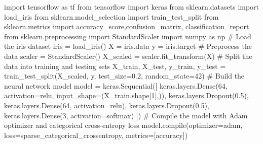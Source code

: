 \documentclass[
  letterpaper,
  DIV=11,
  numbers=noendperiod]{scrreprt}
\newenvironment{Shaded}{\begin{snugshade}}{\end{snugshade}}
\newcommand{\BuiltInTok}[1]{\textcolor[rgb]{0.00,0.23,0.31}{#1}}
\newcommand{\CommentTok}[1]{\textcolor[rgb]{0.37,0.37,0.37}{#1}}
\newcommand{\DecValTok}[1]{\textcolor[rgb]{0.68,0.00,0.00}{#1}}
\newcommand{\FloatTok}[1]{\textcolor[rgb]{0.68,0.00,0.00}{#1}}
\newcommand{\ImportTok}[1]{\textcolor[rgb]{0.00,0.46,0.62}{#1}}
\newcommand{\NormalTok}[1]{\textcolor[rgb]{0.00,0.23,0.31}{#1}}
\newcommand{\OperatorTok}[1]{\textcolor[rgb]{0.37,0.37,0.37}{#1}}
\newcommand{\StringTok}[1]{\textcolor[rgb]{0.13,0.47,0.30}{#1}}
\begin{document}
\begin{Shaded}
\begin{Highlighting}[]
\ImportTok{import}\NormalTok{ tensorflow }\ImportTok{as}\NormalTok{ tf}
\ImportTok{from}\NormalTok{ tensorflow }\ImportTok{import}\NormalTok{ keras}
\ImportTok{from}\NormalTok{ sklearn.datasets }\ImportTok{import}\NormalTok{ load\_iris}
\ImportTok{from}\NormalTok{ sklearn.model\_selection }\ImportTok{import}\NormalTok{ train\_test\_split}
\ImportTok{from}\NormalTok{ sklearn.metrics }\ImportTok{import}\NormalTok{ accuracy\_score,confusion\_matrix, classification\_report  }
\ImportTok{from}\NormalTok{ sklearn.preprocessing }\ImportTok{import}\NormalTok{ StandardScaler}
\ImportTok{import}\NormalTok{ numpy }\ImportTok{as}\NormalTok{ np}
\CommentTok{\# Load the iris dataset}
\NormalTok{iris }\OperatorTok{=}\NormalTok{ load\_iris()}
\NormalTok{X }\OperatorTok{=}\NormalTok{ iris.data}
\NormalTok{y }\OperatorTok{=}\NormalTok{ iris.target}
\CommentTok{\# Preprocess the data}
\NormalTok{scaler }\OperatorTok{=}\NormalTok{ StandardScaler()}
\NormalTok{X\_scaled }\OperatorTok{=}\NormalTok{ scaler.fit\_transform(X)}
\CommentTok{\# Split the data into training and testing sets}
\NormalTok{X\_train, X\_test, y\_train, y\_test }\OperatorTok{=}\NormalTok{ train\_test\_split(X\_scaled, y, test\_size}\OperatorTok{=}\FloatTok{0.2}\NormalTok{, random\_state}\OperatorTok{=}\DecValTok{42}\NormalTok{)}
\CommentTok{\# Build the neural network model}
\NormalTok{model }\OperatorTok{=}\NormalTok{ keras.Sequential([}
\NormalTok{    keras.layers.Dense(}\DecValTok{64}\NormalTok{, activation}\OperatorTok{=}\StringTok{\textquotesingle{}relu\textquotesingle{}}\NormalTok{, input\_shape}\OperatorTok{=}\NormalTok{(X\_train.shape[}\DecValTok{1}\NormalTok{],)),}
\NormalTok{    keras.layers.Dropout(}\FloatTok{0.5}\NormalTok{),}
\NormalTok{    keras.layers.Dense(}\DecValTok{64}\NormalTok{, activation}\OperatorTok{=}\StringTok{\textquotesingle{}relu\textquotesingle{}}\NormalTok{),}
\NormalTok{    keras.layers.Dropout(}\FloatTok{0.5}\NormalTok{),}
\NormalTok{    keras.layers.Dense(}\DecValTok{3}\NormalTok{, activation}\OperatorTok{=}\StringTok{\textquotesingle{}softmax\textquotesingle{}}\NormalTok{)}
\NormalTok{]) }
\CommentTok{\# Compile the model with Adam optimizer and categorical cross{-}entropy loss}
\NormalTok{model.}\BuiltInTok{compile}\NormalTok{(optimizer}\OperatorTok{=}\StringTok{\textquotesingle{}adam\textquotesingle{}}\NormalTok{, loss}\OperatorTok{=}\StringTok{\textquotesingle{}sparse\_categorical\_crossentropy\textquotesingle{}}\NormalTok{, metrics}\OperatorTok{=}\NormalTok{[}\StringTok{\textquotesingle{}accuracy\textquotesingle{}}\NormalTok{])}

\end{Highlighting}
\end{Shaded}
\end{document}
